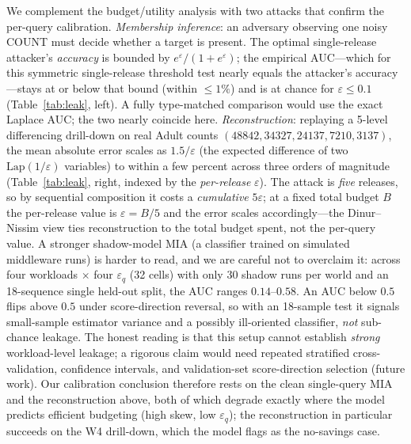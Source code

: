 \documentclass[sigconf,nonacm]{acmart}
\newcommand{\eps}{\varepsilon}
\newcommand{\Lap}{\mathrm{Lap}}
\begin{document}
We complement the budget/utility analysis with two attacks that confirm the per-query calibration. \emph{Membership inference}: an adversary observing one noisy COUNT must decide whether a target is present. The optimal single-release attacker's \emph{accuracy} is bounded by $e^\eps/(1+e^\eps)$; the empirical AUC---which for this symmetric single-release threshold test nearly equals the attacker's accuracy---stays at or below that bound (within $\le1\%$) and is at chance for $\eps\le0.1$ (Table~\ref{tab:leak}, left). A fully type-matched comparison would use the exact Laplace AUC; the two nearly coincide here. \emph{Reconstruction}: replaying a 5-level differencing drill-down on real Adult counts $(48842,34327,24137,7210,3137)$, the mean absolute error scales as $1.5/\eps$ (the expected difference of two $\Lap(1/\eps)$ variables) to within a few percent across three orders of magnitude (Table~\ref{tab:leak}, right, indexed by the \emph{per-release} $\eps$). The attack is \emph{five} releases, so by sequential composition it costs a \emph{cumulative} $5\eps$; at a fixed total budget $B$ the per-release value is $\eps{=}B/5$ and the error scales accordingly---the Dinur--Nissim view ties reconstruction to the total budget spent, not the per-query value. A stronger shadow-model MIA (a classifier trained on simulated middleware runs) is harder to read, and we are careful not to overclaim it: across four workloads $\times$ four $\eps_q$ (32 cells) with only 30 shadow runs per world and an 18-sequence single held-out split, the AUC ranges $0.14$--$0.58$. An AUC below $0.5$ flips above $0.5$ under score-direction reversal, so with an 18-sample test it signals small-sample estimator variance and a possibly ill-oriented classifier, \emph{not} sub-chance leakage. The honest reading is that this setup cannot establish \emph{strong} workload-level leakage; a rigorous claim would need repeated stratified cross-validation, confidence intervals, and validation-set score-direction selection (future work). Our calibration conclusion therefore rests on the clean single-query MIA and the reconstruction above, both of which degrade exactly where the model predicts efficient budgeting (high skew, low $\eps_q$); the reconstruction in particular succeeds on the W4 drill-down, which the model flags as the no-savings case.
\end{document}
